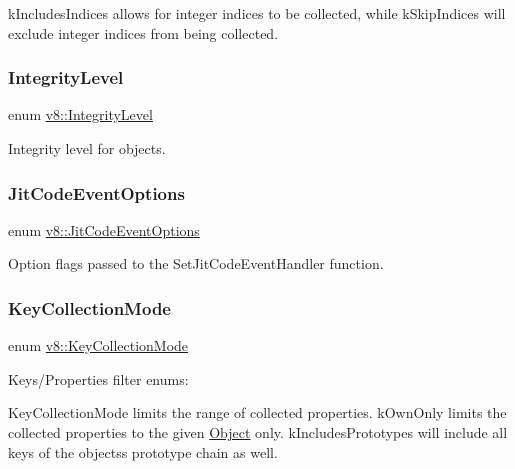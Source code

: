 k\+Includes\+Indices allows for integer indices to be collected, while k\+Skip\+Indices will exclude integer indices from being collected. \mbox{\label{namespacev8_a02642d03ff1eecc2fd358626499c2e30}} 
\subsubsection{\texorpdfstring{Integrity\+Level}{IntegrityLevel}}
{\footnotesize\ttfamily enum \mbox{\hyperlink{namespacev8_a02642d03ff1eecc2fd358626499c2e30}{v8\+::\+Integrity\+Level}}\hspace{0.3cm}{\ttfamily [strong]}}

Integrity level for objects. \mbox{\label{namespacev8_a06f34fa4fa4cfc8518366808d1d461c1}} 
\subsubsection{\texorpdfstring{Jit\+Code\+Event\+Options}{JitCodeEventOptions}}
{\footnotesize\ttfamily enum \mbox{\hyperlink{namespacev8_a06f34fa4fa4cfc8518366808d1d461c1}{v8\+::\+Jit\+Code\+Event\+Options}}}

Option flags passed to the Set\+Jit\+Code\+Event\+Handler function. \mbox{\label{namespacev8_a0cee20f5c7f0d59d0835af8e537388dc}} 
\subsubsection{\texorpdfstring{Key\+Collection\+Mode}{KeyCollectionMode}}
{\footnotesize\ttfamily enum \mbox{\hyperlink{namespacev8_a0cee20f5c7f0d59d0835af8e537388dc}{v8\+::\+Key\+Collection\+Mode}}\hspace{0.3cm}{\ttfamily [strong]}}

Keys/\+Properties filter enums\+:

Key\+Collection\+Mode limits the range of collected properties. k\+Own\+Only limits the collected properties to the given \mbox{\hyperlink{classv8_1_1Object}{Object}} only. k\+Includes\+Prototypes will include all keys of the objects\textquotesingle{}s prototype chain as well. \mbox{\label{namespacev8_aa65aeff871614520d8033dead4b34e38}} 
